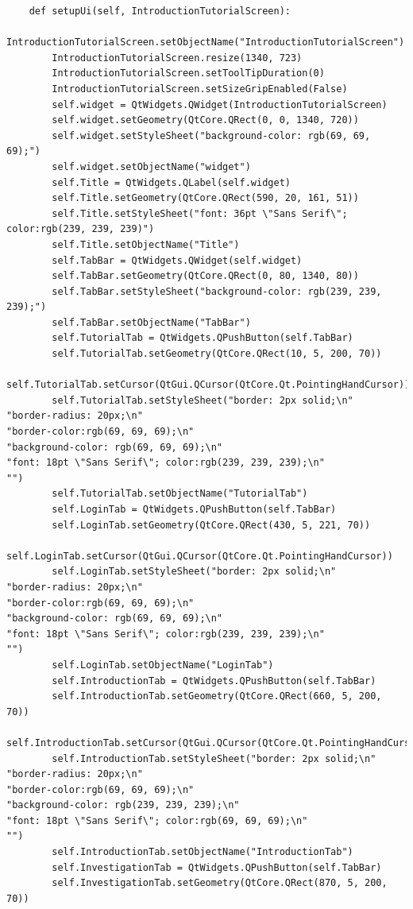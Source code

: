 \documentclass{article}
\begin{document}
\begin{lstlisting}
    def setupUi(self, IntroductionTutorialScreen):
        IntroductionTutorialScreen.setObjectName("IntroductionTutorialScreen")
        IntroductionTutorialScreen.resize(1340, 723)
        IntroductionTutorialScreen.setToolTipDuration(0)
        IntroductionTutorialScreen.setSizeGripEnabled(False)
        self.widget = QtWidgets.QWidget(IntroductionTutorialScreen)
        self.widget.setGeometry(QtCore.QRect(0, 0, 1340, 720))
        self.widget.setStyleSheet("background-color: rgb(69, 69, 69);")
        self.widget.setObjectName("widget")
        self.Title = QtWidgets.QLabel(self.widget)
        self.Title.setGeometry(QtCore.QRect(590, 20, 161, 51))
        self.Title.setStyleSheet("font: 36pt \"Sans Serif\"; color:rgb(239, 239, 239)")
        self.Title.setObjectName("Title")
        self.TabBar = QtWidgets.QWidget(self.widget)
        self.TabBar.setGeometry(QtCore.QRect(0, 80, 1340, 80))
        self.TabBar.setStyleSheet("background-color: rgb(239, 239, 239);")
        self.TabBar.setObjectName("TabBar")
        self.TutorialTab = QtWidgets.QPushButton(self.TabBar)
        self.TutorialTab.setGeometry(QtCore.QRect(10, 5, 200, 70))
        self.TutorialTab.setCursor(QtGui.QCursor(QtCore.Qt.PointingHandCursor))
        self.TutorialTab.setStyleSheet("border: 2px solid;\n"
"border-radius: 20px;\n"
"border-color:rgb(69, 69, 69);\n"
"background-color: rgb(69, 69, 69);\n"
"font: 18pt \"Sans Serif\"; color:rgb(239, 239, 239);\n"
"")
        self.TutorialTab.setObjectName("TutorialTab")
        self.LoginTab = QtWidgets.QPushButton(self.TabBar)
        self.LoginTab.setGeometry(QtCore.QRect(430, 5, 221, 70))
        self.LoginTab.setCursor(QtGui.QCursor(QtCore.Qt.PointingHandCursor))
        self.LoginTab.setStyleSheet("border: 2px solid;\n"
"border-radius: 20px;\n"
"border-color:rgb(69, 69, 69);\n"
"background-color: rgb(69, 69, 69);\n"
"font: 18pt \"Sans Serif\"; color:rgb(239, 239, 239);\n"
"")
        self.LoginTab.setObjectName("LoginTab")
        self.IntroductionTab = QtWidgets.QPushButton(self.TabBar)
        self.IntroductionTab.setGeometry(QtCore.QRect(660, 5, 200, 70))
        self.IntroductionTab.setCursor(QtGui.QCursor(QtCore.Qt.PointingHandCursor))
        self.IntroductionTab.setStyleSheet("border: 2px solid;\n"
"border-radius: 20px;\n"
"border-color:rgb(69, 69, 69);\n"
"background-color: rgb(239, 239, 239);\n"
"font: 18pt \"Sans Serif\"; color:rgb(69, 69, 69);\n"
"")
        self.IntroductionTab.setObjectName("IntroductionTab")
        self.InvestigationTab = QtWidgets.QPushButton(self.TabBar)
        self.InvestigationTab.setGeometry(QtCore.QRect(870, 5, 200, 70))

\end{lstlisting}
\end{document}
